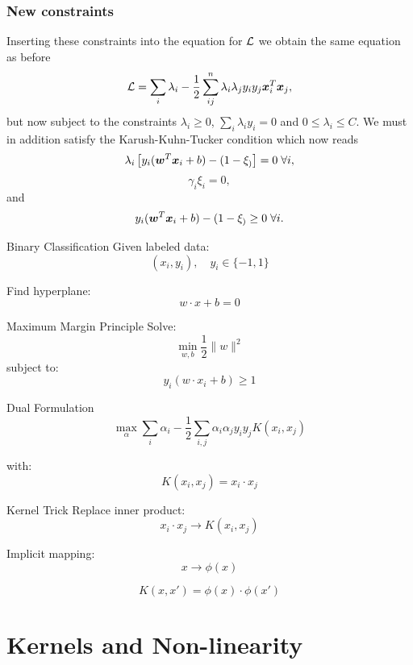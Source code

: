 \documentclass{beamer}
\begin{document}
\begin{frame}
\frametitle{New constraints}

Inserting these constraints into the equation for ${\cal L}$ we obtain the same equation as before
\[
{\cal L}=\sum_i\lambda_i-\frac{1}{2}\sum_{ij}^n\lambda_i\lambda_jy_iy_j\bm{x}_i^T\bm{x}_j,
\]
but now subject to the constraints $\lambda_i\geq 0$, $\sum_i\lambda_iy_i=0$ and $0\leq\lambda_i \leq C$. 
We must in addition satisfy the Karush-Kuhn-Tucker condition which now reads
\[
\lambda_i\left[y_i(\bm{w}^T\bm{x}_i+b) -(1-\xi_)\right]=0 \hspace{0.1cm}\forall i,
\]
\[
\gamma_i\xi_i = 0,
\]
and 
\[
y_i(\bm{w}^T\bm{x}_i+b) -(1-\xi_) \geq 0 \hspace{0.1cm}\forall i.
\]
\end{frame}

\begin{frame}{Binary Classification}
Given labeled data:
\[
(x_i, y_i), \quad y_i \in \{-1,1\}
\]

Find hyperplane:
\[
w \cdot x + b = 0
\]
\end{frame}

\begin{frame}{Maximum Margin Principle}
Solve:
\[
\min_{w,b} \frac{1}{2}\|w\|^2
\]
subject to:
\[
y_i(w\cdot x_i + b) \ge 1
\]
\end{frame}

\begin{frame}{Dual Formulation}
\[
\max_{\alpha}
\sum_i \alpha_i
-
\frac{1}{2}
\sum_{i,j} \alpha_i \alpha_j y_i y_j K(x_i,x_j)
\]

with:
\[
K(x_i,x_j) = x_i \cdot x_j
\]
\end{frame}

\begin{frame}{Kernel Trick}
Replace inner product:
\[
x_i \cdot x_j \rightarrow K(x_i,x_j)
\]

\medskip

Implicit mapping:
\[
x \rightarrow \phi(x)
\]

\[
K(x,x') = \phi(x) \cdot \phi(x')
\]
\end{frame}


\section{Kernels and Non-linearity}
\end{document}

